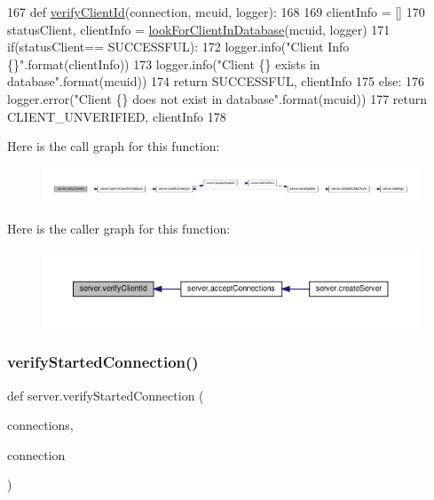 \begin{DoxyCode}
167 \textcolor{keyword}{def }\hyperlink{namespaceserver_a4c51be10ba9f982375f4c0a426078a96}{verifyClientId}(connection, mcuid, logger):
168      
169      clientInfo = []
170      statusClient, clientInfo = \hyperlink{namespaceserver_a998e5671e2ab0c79b9abe44e87e203a0}{lookForClientInDatabase}(mcuid, logger)
171      if(statusClient== SUCCESSFUL):
172           logger.info(\textcolor{stringliteral}{"Client Info \{\}"}.format(clientInfo))
173           logger.info(\textcolor{stringliteral}{"Client \{\} exists in database"}.format(mcuid))
174           \textcolor{keywordflow}{return} SUCCESSFUL, clientInfo
175      \textcolor{keywordflow}{else}:
176           logger.error(\textcolor{stringliteral}{"Client \{\} does not exist in database"}.format(mcuid))
177           \textcolor{keywordflow}{return} CLIENT\_UNVERIFIED, clientInfo
178                    
\end{DoxyCode}
Here is the call graph for this function\+:
\nopagebreak
\begin{figure}[H]
\begin{center}
\leavevmode
\includegraphics[width=350pt]{namespaceserver_a4c51be10ba9f982375f4c0a426078a96_cgraph}
\end{center}
\end{figure}
Here is the caller graph for this function\+:
\nopagebreak
\begin{figure}[H]
\begin{center}
\leavevmode
\includegraphics[width=350pt]{namespaceserver_a4c51be10ba9f982375f4c0a426078a96_icgraph}
\end{center}
\end{figure}
\mbox{\label{namespaceserver_a4e6504daf55d2ef34d4d2ea5b30074f3}} 
\subsubsection{\texorpdfstring{verify\+Started\+Connection()}{verifyStartedConnection()}}
{\footnotesize\ttfamily def server.\+verify\+Started\+Connection (\begin{DoxyParamCaption}\item[{}]{connections,  }\item[{}]{connection }\end{DoxyParamCaption})}


